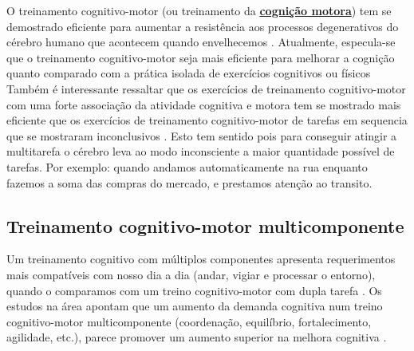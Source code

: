 O treinamento cognitivo-motor (ou treinamento da \hyperref[def:cognitivo-motor]{\textbf{cognição motora}}) 
tem se demostrado eficiente para aumentar a resistência aos processos degenerativos do cérebro humano que acontecem quando envelhecemos \cite[pp. 22]{variseefeitos}.
Atualmente, especula-se que o treinamento cognitivo-motor seja mais eficiente para melhorar a cognição 
quanto comparado com a prática isolada de exercícios cognitivos ou físicos 
\cite{wollesen2020effects} \cite[pp. 22]{variseefeitos}
Também é interessante ressaltar que os exercícios de treinamento cognitivo-motor com 
uma forte associação da atividade cognitiva e motora
tem se mostrado mais eficiente que os exercícios de treinamento cognitivo-motor de tarefas em sequencia 
que se mostraram inconclusivos
\cite{wollesen2020effects} \cite[pp. 22]{variseefeitos}. 
Esto tem sentido pois para conseguir atingir a multitarefa o cérebro leva
ao modo inconsciente a maior quantidade possível de tarefas. 
Por exemplo: quando andamos automaticamente na rua enquanto fazemos a soma das compras do mercado,
e prestamos atenção ao transito.

\subsection{Treinamento cognitivo-motor multicomponente}
\label{subsec:sec-motor-cognitive-multicomponente}
Um treinamento cognitivo com múltiplos componentes apresenta requerimentos mais compatíveis 
com nosso dia a dia (andar, vigiar e processar o entorno), 
quando o comparamos com um treino cognitivo-motor com dupla tarefa
\cite[pp. 23]{variseefeitos}. 
Os estudos na área apontam que um aumento da demanda cognitiva num treino cognitivo-motor multicomponente 
(coordenação, equilíbrio, fortalecimento, agilidade, etc.), 
parece promover um aumento superior na melhora cognitiva
\cite[pp. 24]{variseefeitos} \cite[pp. 44]{biehl2016pratica} \cite{medeiros2018impacto}. 


